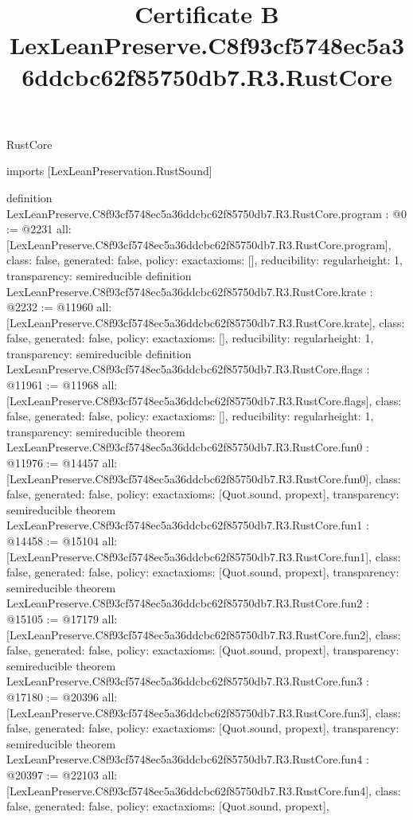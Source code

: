 \begin{lexlean}{RustCore}
\title{Certificate B LexLeanPreserve.C8f93cf5748ec5a36ddcbc62f85750db7.R3.RustCore}
\begin{coremodule}
imports [LexLeanPreservation.RustSound]

definition LexLeanPreserve.C8f93cf5748ec5a36ddcbc62f85750db7.R3.RustCore.program : @0 := @2231 {
  all: [LexLeanPreserve.C8f93cf5748ec5a36ddcbc62f85750db7.R3.RustCore.program],
  class: false,
  generated: false,
  policy: exact{axioms: []},
  reducibility: regular{height: 1},
  transparency: semireducible
}
definition LexLeanPreserve.C8f93cf5748ec5a36ddcbc62f85750db7.R3.RustCore.krate : @2232 := @11960 {
  all: [LexLeanPreserve.C8f93cf5748ec5a36ddcbc62f85750db7.R3.RustCore.krate],
  class: false,
  generated: false,
  policy: exact{axioms: []},
  reducibility: regular{height: 1},
  transparency: semireducible
}
definition LexLeanPreserve.C8f93cf5748ec5a36ddcbc62f85750db7.R3.RustCore.flags : @11961 := @11968 {
  all: [LexLeanPreserve.C8f93cf5748ec5a36ddcbc62f85750db7.R3.RustCore.flags],
  class: false,
  generated: false,
  policy: exact{axioms: []},
  reducibility: regular{height: 1},
  transparency: semireducible
}
theorem LexLeanPreserve.C8f93cf5748ec5a36ddcbc62f85750db7.R3.RustCore.fun0 : @11976 := @14457 {
  all: [LexLeanPreserve.C8f93cf5748ec5a36ddcbc62f85750db7.R3.RustCore.fun0],
  class: false,
  generated: false,
  policy: exact{axioms: [Quot.sound, propext]},
  transparency: semireducible
}
theorem LexLeanPreserve.C8f93cf5748ec5a36ddcbc62f85750db7.R3.RustCore.fun1 : @14458 := @15104 {
  all: [LexLeanPreserve.C8f93cf5748ec5a36ddcbc62f85750db7.R3.RustCore.fun1],
  class: false,
  generated: false,
  policy: exact{axioms: [Quot.sound, propext]},
  transparency: semireducible
}
theorem LexLeanPreserve.C8f93cf5748ec5a36ddcbc62f85750db7.R3.RustCore.fun2 : @15105 := @17179 {
  all: [LexLeanPreserve.C8f93cf5748ec5a36ddcbc62f85750db7.R3.RustCore.fun2],
  class: false,
  generated: false,
  policy: exact{axioms: [Quot.sound, propext]},
  transparency: semireducible
}
theorem LexLeanPreserve.C8f93cf5748ec5a36ddcbc62f85750db7.R3.RustCore.fun3 : @17180 := @20396 {
  all: [LexLeanPreserve.C8f93cf5748ec5a36ddcbc62f85750db7.R3.RustCore.fun3],
  class: false,
  generated: false,
  policy: exact{axioms: [Quot.sound, propext]},
  transparency: semireducible
}
theorem LexLeanPreserve.C8f93cf5748ec5a36ddcbc62f85750db7.R3.RustCore.fun4 : @20397 := @22103 {
  all: [LexLeanPreserve.C8f93cf5748ec5a36ddcbc62f85750db7.R3.RustCore.fun4],
  class: false,
  generated: false,
  policy: exact{axioms: [Quot.sound, propext]},
}
\end{coremodule}
\end{lexlean}
